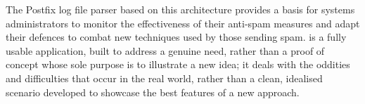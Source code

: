 The Postfix log file parser based on this architecture provides a basis for
systems administrators to monitor the effectiveness of their anti-spam
measures and adapt their defences to combat new techniques used by those
sending spam.  \parsername{} is a fully usable application, built to
address a genuine need, rather than a proof of concept whose sole purpose
is to illustrate a new idea; it deals with the oddities and difficulties
that occur in the real world, rather than a clean, idealised scenario
developed to showcase the best features of a new approach.

